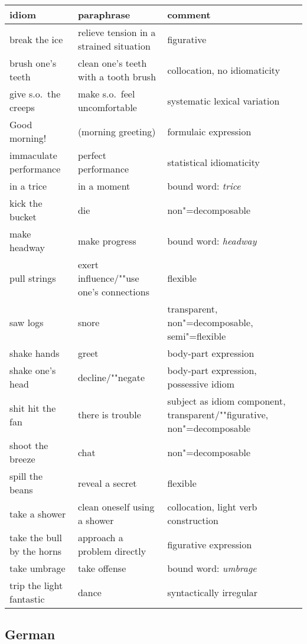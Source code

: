 \documentclass[output=paper,biblatex,babelshorthands,newtxmath,draftmode,colorlinks,citecolor=brown]{langscibook}
\begin{document}
\begin{tabular}{@{}lL{3.8cm}L{3.8cm}@{}}
idiom & paraphrase & comment\\\hline
break the ice      & relieve tension in a strained situation  & figurative\\
brush one's teeth  & clean one's teeth with a tooth brush     & collocation, no idiomaticity\\
give s.o.\ the creeps & make s.o.\ feel uncomfortable               & systematic lexical variation\\
Good morning!      & (morning greeting)                       & formulaic expression\\
immaculate performance & perfect performance & statistical idiomaticity\\
in a trice & in a moment & bound word: \emph{trice}\\
kick the bucket & die & non"=decomposable\\
make headway & make progress & bound word: \emph{headway}\\
pull strings & exert influence/""use one's connections & flexible\\
saw logs & snore & {transparent, non"=decomposable, semi"=flexible}\\
shake hands & greet & body-part expression\\
shake one's head & decline/""negate & {body-part expression, possessive idiom}\\
shit hit the fan & there is trouble & {subject as idiom component, transparent/""figurative, non"=decomposable}\\
shoot the breeze & chat & non"=decomposable\\
spill the beans & reveal a secret & flexible\\
take a shower & clean oneself using a shower & collocation, light verb construction\\
take the bull by the horns & {approach a problem directly} & figurative expression\\
take umbrage & take offense & bound word: \emph{umbrage}\\
trip the light fantastic & dance & syntactically irregular\\
\end{tabular}


\subsection*{German}
\end{document}

